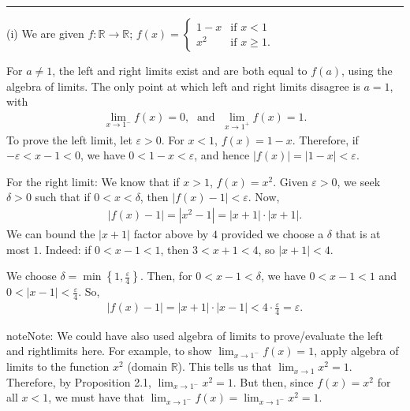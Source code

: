 \documentclass[letterpaper,10pt,english]{jupyterBook}
\begin{document}
\bigskip\hrule\bigskip

\label{\detokenize{Solutions-full:id3}}
\sphinxAtStartPar
{\hyperref[\detokenize{Problems:id8}]{}} 

\sphinxAtStartPar
(i) We are given \(f:\mathbb{R}\to\mathbb{R}\); \(f(x) = \begin{cases} 1 -x & \text{if }x < 1\\ x^{2}& \text{if }x \geq 1. \end{cases}\)

\sphinxAtStartPar
For \(a\neq 1\), the left and right limits exist and are both equal to \(f(a)\), using the algebra of limits. The only point at which left and right limits disagree is \(a = 1\), with
\begin{equation*}
\begin{split}
\lim_{x \rightarrow 1^-}f(x) = 0, \; \text{ and } \; \lim_{x \rightarrow 1^+}f(x) = 1.
\end{split}
\end{equation*}
\sphinxAtStartPar
To prove the left limit, let \(\varepsilon>0\). For \(x<1\), \(f(x)=1-x\). Therefore, if \(-\varepsilon<x-1<0\), we have \(0<1-x<\varepsilon\), and hence \(|f(x)|=|1-x|<\varepsilon\).

\sphinxAtStartPar
For the right limit: We know that if \(x>1\), \(f(x)=x^2\). Given \(\varepsilon>0\), we seek \(\delta>0\) such that if \(0<x<\delta\), then \(|f(x)-1|<\varepsilon\). Now,
\begin{equation*}
\begin{split}
|f(x)-1|=|x^2-1|=|x+1|\cdot|x+1|.
\end{split}
\end{equation*}
\sphinxAtStartPar
We can bound the \(|x+1|\) factor above by \(4\) provided we choose a \(\delta\) that is at most \(1\). Indeed: if \(0<x-1<1\), then \(3<x+1<4\), so \(|x+1|<4\).

\sphinxAtStartPar
We choose \(\delta=\min\left\{1,\frac{\varepsilon}{4}\right\}\). Then, for \(0<x-1<\delta\), we have \(0<x-1<1\) and \(0<|x-1|<\frac{\varepsilon}{4}\). So,
\begin{equation*}
\begin{split}
|f(x)-1|=|x+1|\cdot|x-1| < 4\cdot\frac{\varepsilon}{4}=\varepsilon.
\end{split}
\end{equation*}
\begin{sphinxadmonition}{note}{Note:}
\sphinxAtStartPar
We could have also used algebra of limits to prove/evaluate the left\sphinxhyphen{} and right\sphinxhyphen{}limits here. For example, to show \(\lim_{x\rightarrow 1^-}f(x)=1\), apply algebra of limits to the function \(x^2\) (domain \(\mathbb{R}\)). This tells us that \(\lim_{x\rightarrow 1}x^2=1\). Therefore, by Proposition 2.1, \(\lim_{x\rightarrow 1^-}x^2=1\). But then, since \(f(x)=x^2\) for all \(x<1\), we must have that \(\lim_{x\rightarrow 1^-}f(x)=\lim_{x\rightarrow 1^-}x^2=1\).
\end{sphinxadmonition}
\end{document}

